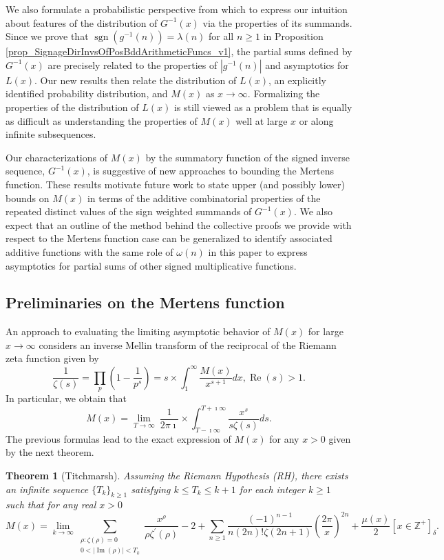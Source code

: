 \documentclass[11pt,reqno,a4letter]{article}
\numberwithin{figure}{section}
\numberwithin{table}{section}
\newcommand{\Iverson}[1]{\ensuremath{\left[#1\right]_{\delta}}}
\theoremstyle{plain}
\newtheorem{theorem}{Theorem}
\numberwithin{theorem}{section}
\theoremstyle{definition}
\renewcommand{\Re}{\operatorname{Re}}
\renewcommand{\Im}{\operatorname{Im}}
\begin{document}
We also formulate a probabilistic perspective from which to express 
our intuition about features of the distribution of $G^{-1}(x)$ 
via the properties of its summands. 
Since we prove that $\operatorname{sgn}(g^{-1}(n)) = \lambda(n)$ for all $n \geq 1$ in 
Proposition \ref{prop_SignageDirInvsOfPosBddArithmeticFuncs_v1}, 
the partial sums defined by $G^{-1}(x)$ are precisely related to the properties of 
$|g^{-1}(n)|$ and asymptotics for $L(x)$. 
Our new results then relate the 
distribution of $L(x)$, an explicitly identified 
probability distribution, and $M(x)$ as $x \rightarrow \infty$. 
Formalizing the properties of the distribution of 
$L(x)$ is still viewed as a problem that is equally as difficult 
as understanding the properties of $M(x)$ well at large $x$ or along infinite subsequences. 

Our characterizations of $M(x)$ by the summatory function of the signed 
inverse sequence, $G^{-1}(x)$, 
is suggestive of new approaches to bounding the Mertens function. 
These results motivate future work to state upper (and possibly lower) bounds 
on $M(x)$ in terms of the additive combinatorial properties of the repeated distinct 
values of the sign weighted summands of $G^{-1}(x)$. 
We also expect that an outline of the method behind the collective proofs we 
provide with respect to the Mertens function case can be generalized to identify 
associated additive functions with the same role of $\omega(n)$ in this paper to 
express asymptotics for partial sums of other signed multiplicative functions. 

\subsection{Preliminaries on the Mertens function}
\label{subSection_Intro_Mx_properties} 

An approach to evaluating the limiting asymptotic 
behavior of $M(x)$ for large $x \rightarrow \infty$ considers an 
inverse Mellin transform of the reciprocal of the Riemann zeta function given by 
\[
\frac{1}{\zeta(s)} = \prod_{p} \left(1 - \frac{1}{p^s}\right) = 
     s \times \int_1^{\infty} \frac{M(x)}{x^{s+1}} dx, \Re(s) > 1. 
\]
In particular, we obtain that 
\[
M(x) = \lim_{T \rightarrow \infty}\ \frac{1}{2\pi\imath} \times \int_{T-\imath\infty}^{T+\imath\infty} 
     \frac{x^s}{s \zeta(s)} ds. 
\] 
The previous formulas lead to the 
exact expression of $M(x)$ for any $x > 0$ 
given by the next theorem. 
\nocite{TITCHMARSH} 

\begin{theorem}[Titchmarsh] 
\label{theorem_MxMellinTransformInvFormula} 
Assuming the Riemann Hypothesis (RH), there exists an infinite sequence 
$\{T_k\}_{k \geq 1}$ satisfying $k \leq T_k \leq k+1$ for each integer $k \geq 1$ 
such that for any real $x > 0$ 
\[
M(x) = \lim_{k \rightarrow \infty} 
     \sum_{\substack{\rho: \zeta(\rho) = 0 \\ 0 < |\Im(\rho)| < T_k}} 
     \frac{x^{\rho}}{\rho \zeta^{\prime}(\rho)} - 2 + 
     \sum_{n \geq 1} \frac{(-1)^{n-1}}{n (2n)! \zeta(2n+1)} 
     \left(\frac{2\pi}{x}\right)^{2n} + 
     \frac{\mu(x)}{2} \Iverson{x \in \mathbb{Z}^{+}}. 
\] 
\end{theorem} 
\end{document}
